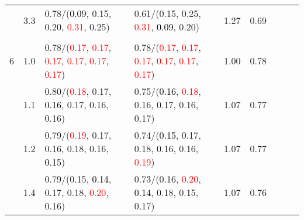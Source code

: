\documentclass[10pt,a4paper]{report}
\begin{document}
\begin{table}[!htbp]
\begin{center}
{\begin{tabular}{ccllccccc}
				  & 3.3                               & 0.78/(\textcolor{black}{0.09}, 0.15, 0.20, \textcolor{red}{0.31}, 0.25)                                                                                                                       & 0.61/(0.15, 0.25, \textcolor{red}{0.31}, \textcolor{black}{0.09}, 0.20)                                                                                                                       & 1.27             & 0.69                     \\
				  &                                   &                                                                                                                                                                                               &                                                                                                                                                                                               &                                             \\
				6 & 1.0                               & 0.78/(\textcolor{red}{0.17}, \textcolor{red}{0.17}, \textcolor{red}{0.17}, \textcolor{red}{0.17}, \textcolor{red}{0.17}, \textcolor{red}{0.17})                                               & 0.78/(\textcolor{red}{0.17}, \textcolor{red}{0.17}, \textcolor{red}{0.17}, \textcolor{red}{0.17}, \textcolor{red}{0.17}, \textcolor{red}{0.17})                                               & 1.00             & 0.78                     \\
				  & 1.1                               & 0.80/(\textcolor{red}{0.18}, 0.17, \textcolor{black}{0.16}, 0.17, 0.16, 0.16)                                                                                                                 & 0.75/(\textcolor{black}{0.16}, \textcolor{red}{0.18}, 0.16, 0.17, 0.16, 0.17)                                                                                                                 & 1.07             & 0.77                     \\
				  & 1.2                               & 0.79/(\textcolor{red}{0.19}, 0.17, 0.16, 0.18, 0.16, \textcolor{black}{0.15})                                                                                                                 & 0.74/(\textcolor{black}{0.15}, 0.17, 0.18, 0.16, 0.16, \textcolor{red}{0.19})                                                                                                                 & 1.07             & 0.77                     \\
				  & 1.4                               & 0.79/(0.15, \textcolor{black}{0.14}, 0.17, 0.18, \textcolor{red}{0.20}, 0.16)                                                                                                                 & 0.73/(0.16, \textcolor{red}{0.20}, \textcolor{black}{0.14}, 0.18, 0.15, 0.17)                                                                                                                 & 1.07             & 0.76                     \\

\end{tabular}}
\end{center}
\end{table}
\end{document}
